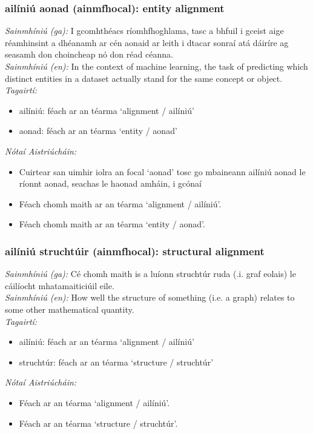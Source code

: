 \subsubsection*{ailíniú aonad (ainmfhocal): entity alignment}
 \noindent \textit{Sainmhíniú (ga):} I gcomhthéacs ríomhfhoghlama, tasc a bhfuil i gceist aige réamhinsint a dhéanamh ar cén aonaid ar leith i dtacar sonraí atá dáiríre ag seasamh don choincheap nó don réad céanna.
\\
 \noindent \textit{Sainmhíniú (en):} In the context of machine learning, the task of predicting which distinct entities in a dataset actually stand for the same concept or object.
\\
 \noindent \textit{Tagairtí:}
\begin{itemize}
	\item ailíniú: féach ar an téarma `alignment / ailíniú'
	\item aonad: féach ar an téarma `entity / aonad'
\end{itemize}

 \noindent \textit{Nótaí Aistriúcháin:}
\begin{itemize}
	\item Cuirtear san uimhir iolra an focal `aonad' tosc go mbaineann ailíniú aonad le ríonnt aonad, seachas le haonad amháin, i gcónaí
	\item Féach chomh maith ar an téarma `alignment / ailíniú'.
	\item Féach chomh maith ar an téarma `entity / aonad'.
\end{itemize}


\subsubsection*{ailíniú struchtúir (ainmfhocal): structural alignment}
 \noindent \textit{Sainmhíniú (ga):} Cé chomh maith is a luíonn struchtúr ruda (.i. graf eolais) le cáilíocht mhatamaiticiúil eile.
\\
 \noindent \textit{Sainmhíniú (en):} How well the structure of something (i.e. a graph) relates to some other mathematical quantity.
\\
 \noindent \textit{Tagairtí:}
\begin{itemize}
	\item ailíniú: féach ar an téarma `alignment / ailíniú'
	\item struchtúr: féach ar an téarma `structure / struchtúr'
\end{itemize}

 \noindent \textit{Nótaí Aistriúcháin:}
\begin{itemize}
	\item Féach ar an téarma `alignment / ailíniú'.
	\item Féach ar an téarma `structure / struchtúr'.
\end{itemize}


